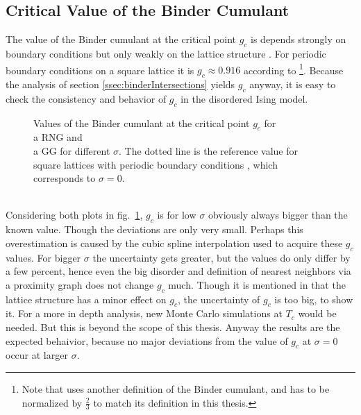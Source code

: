 \subsection{Critical Value of the Binder Cumulant}
    The value of the Binder cumulant at the critical point \(g_c\) is
    depends strongly on boundary conditions but only weakly on the lattice
    structure \cite{BinderValue}. For periodic boundary conditions on a
    square lattice it is \(g_c \approx 0.916\) according to \cite{BinderValue}
        \footnote{Note that \cite{BinderValue} uses another definition of
            the Binder cumulant, and has to be normalized by \(\frac{2}{3}\)
            to match its definition in this thesis.}.
    Because the analysis of section \ref{ssec:binderIntersections}
    yields \(g_c\) anyway, it is easy to check the consistency and
    behavior of \(g_c\) in the disordered Ising model.\\
    \begin{figure}[htbp]
        \centering
        \caption[Values of the Binder Cumulant at the Critical Point $g_c$]
        {
            Values of the Binder cumulant at the critical point \(g_c\)
            for\\
             a RNG and\\
             a GG for different \(\sigma\).
            The dotted line is the reference value for square lattices
            with periodic boundary conditions \cite{BinderValue}, which
            corresponds to \(\sigma = 0\).
        }
        \label{fig:TcG}
    \end{figure}\\
    Considering both plots in fig.\ \ref{fig:TcG}, \(g_c\) is for low
    \(\sigma\) obviously always bigger than the known value. Though the
    deviations are only very small. Perhaps this overestimation is caused
    by the cubic spline interpolation used to acquire these \(g_c\) values.
    For bigger \(\sigma\) the uncertainty gets greater, but the values
    do only differ by a few percent, hence even the big disorder and
    definition of nearest neighbors via a proximity graph does not change
    \(g_c\) much. Though it is mentioned in \cite{BinderValue} that the
    lattice structure has a minor effect on \(g_c\), the uncertainty of
    \(g_c\) is too big, to show it. For a more in depth analysis, new
    Monte Carlo simulations at \(T_c\) would be needed. But this is
    beyond the scope of this thesis. Anyway the results are the expected
    behaivior, because no major deviations from the value of \(g_c\) at
    \(\sigma = 0\) occur at larger \(\sigma\).
